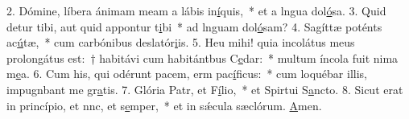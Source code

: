 2. Dómine, líbera ánimam meam a lábis in\uline{í}quis,~* et a lngua dol\uline{ó}sa.
3. Quid detur tibi, aut quid appontur t\uline{i}bi~* ad lnguam dol\uline{ó}sam?
4. Sagíttæ poténts ac\uline{ú}tæ,~* cum carbónibus deslatór\uline{i}is.
5. Heu mihi! quia incolátus meus prolongátus est:~† habitávi cum habitántbus C\uline{e}dar:~* multum íncola fuit nima m\uline{e}a.
6. Cum his, qui odérunt pacem, erm pac\uline{í}ficus:~* cum loquébar illis, impugnbant me gr\uline{a}tis.
7. Glória Patr, et F\uline{í}lio,~* et Spirtui S\uline{a}ncto.
8. Sicut erat in princípio, et nnc, et s\uline{e}mper,~* et in sǽcula sæclórum. \uline{A}men.
